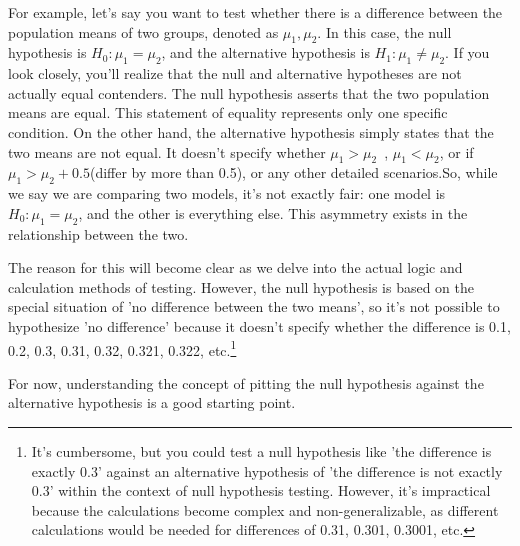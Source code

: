 \documentclass{ltjsbook}
\begin{document}
For example, let's say you want to test whether there is a difference between the population means of two groups, denoted as $\mu_1,\mu_2$. In this case, the null hypothesis is $H_0 : \mu_1 = \mu_2$, and the alternative hypothesis is $H_1:\mu_1 \neq \mu_2$. If you look closely, you'll realize that the null and alternative hypotheses are not actually equal contenders. The null hypothesis asserts that the two population means are equal. This statement of equality represents only one specific condition. On the other hand, the alternative hypothesis simply states that the two means are not equal. It doesn't specify whether $\mu_1>\mu_2$\ , $\mu_1<\mu_2$, or if $\mu_1 > \mu_2 + 0.5$(differ by more than 0.5), or any other detailed scenarios.So, while we say we are comparing two models, it's not exactly fair: one model is $H_0 : \mu_1 = \mu_2$, and the other is everything else. This asymmetry exists in the relationship between the two.

The reason for this will become clear as we delve into the actual logic and calculation methods of testing. However, the null hypothesis is based on the special situation of 'no difference between the two means', so it's not possible to hypothesize 'no difference' because it doesn't specify whether the difference is 0.1, 0.2, 0.3, 0.31, 0.32, 0.321, 0.322, etc.\footnote{It's cumbersome, but you could test a null hypothesis like 'the difference is exactly 0.3' against an alternative hypothesis of 'the difference is not exactly 0.3' within the context of null hypothesis testing. However, it's impractical because the calculations become complex and non-generalizable, as different calculations would be needed for differences of 0.31, 0.301, 0.3001, etc.}

For now, understanding the concept of pitting the null hypothesis against the alternative hypothesis is a good starting point.
\end{document}
